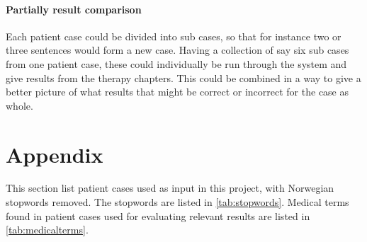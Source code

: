 \documentclass[a4paper, 11pt]{article}
\begin{document}
\paragraph{Partially result comparison}
Each patient case could be divided into sub cases, so that for instance two or three sentences would form a new case. Having a collection of say six sub cases from one patient case, these could individually be run through the system and give results from the therapy chapters. This could be combined in a way to give a better picture of what results that might be correct or incorrect for the case as whole.


\appendix
\section{Appendix}
\label{appendix}
This section list patient cases used as input in this project, with Norwegian
stopwords removed. The stopwords are listed in \autoref{tab:stopwords}.
Medical terms found in patient cases used for evaluating relevant results are
listed in \autoref{tab:medicalterms}.



\end{document}
